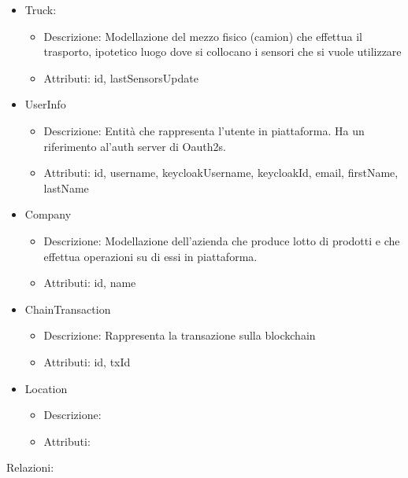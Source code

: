 \documentclass[a4paper,11pt]{article}
\begin{document}
\begin{itemize}
\begin{itemize}
        \end{itemize}
  \item Truck:
        \begin{itemize}
          \item Descrizione: Modellazione del mezzo fisico (camion) che effettua il trasporto, ipotetico luogo dove si collocano i sensori che si vuole utilizzare
          \item Attributi: id, lastSensorsUpdate
        \end{itemize}
  \item UserInfo
        \begin{itemize}
          \item Descrizione: Entità che rappresenta l'utente in piattaforma. Ha un riferimento al'auth server di Oauth2s.
          \item Attributi: id, username, keycloakUsername, keycloakId, email, firstName, lastName
        \end{itemize}
  \item Company
        \begin{itemize}
          \item Descrizione: Modellazione dell'azienda che produce lotto di prodotti e che effettua operazioni su di essi in piattaforma.
          \item Attributi: id, name
        \end{itemize}
  \item ChainTransaction
        \begin{itemize}
          \item Descrizione: Rappresenta la transazione sulla blockchain
          \item Attributi: id, txId
        \end{itemize}
  \item Location
        \begin{itemize}
          \item Descrizione:
          \item Attributi:
        \end{itemize}
\end{itemize}

Relazioni:
\end{document}
